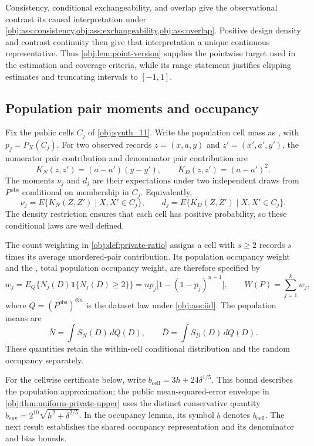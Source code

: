 Consistency, conditional exchangeability, and overlap give the observational contrast its causal interpretation under \cref{obj:ass:consistency,obj:ass:exchangeability,obj:ass:overlap}. Positive design density and contrast continuity then give that interpretation a unique continuous representative. Thus \cref{obj:lem:point-version} supplies the pointwise target used in the estimation and coverage criteria, while its range statement justifies clipping estimates and truncating intervals to \([-1,1]\).

\subsection{Population pair moments and occupancy}

Fix the public cells \(C_j\) of \cref{obj:synth_11}. Write the population cell mass as , with \(p_j=P_X(C_j)\). For two observed records \(z=(x,a,y)\) and \(z'=(x',a',y')\), the numerator pair contribution  and denominator pair contribution  are
\[
K_N(z,z')=(a-a')(y-y'),
\qquad
K_D(z,z')=(a-a')^2.
\]
The moments \(\nu_j\) and \(d_j\) are their expectations under two independent draws from \(P^{\mathrm{obs}}\) conditional on membership in \(C_j\). Equivalently,
\[
\nu_j=E\{K_N(Z,Z')\mid X,X'\in C_j\},
\qquad
d_j=E\{K_D(Z,Z')\mid X,X'\in C_j\}.
\]
The density restriction ensures that each cell has positive probability, so these conditional laws are well defined.

The count weighting in \cref{obj:def:private-ratio} assigns a cell with \(s\ge2\) records \(s\) times its average unordered-pair contribution. Its population occupancy weight and the , total population occupancy weight, are therefore specified by
\[
w_j
=
E_Q\{N_j(D)\mathbf1\{N_j(D)\ge2\}\}
=
np_j\bigl[1-(1-p_j)^{n-1}\bigr],
\qquad
W(P)=\sum_{j=1}^k w_j,
\]
where \(Q=(P^{\mathrm{obs}})^{\otimes n}\) is the dataset law under \cref{obj:ass:iid}. The population means are
\[
\overline N=\int S_N(D)\,dQ(D),
\qquad
\overline D=\int S_D(D)\,dQ(D).
\]
These quantities retain the within-cell conditional distribution and the random occupancy separately.

For the cellwise certificate below, write \(b_{\mathrm{cell}}=3h+24\delta^{1/5}\). This bound describes the population approximation; the public mean-squared-error envelope in \cref{obj:thm:uniform-private-upper} uses the distinct conservative quantity \(b_{\mathrm{env}}=2^{10}\sqrt{h^2+\delta^{2/5}}\). In the occupancy lemma, its symbol \(b\) denotes \(b_{\mathrm{cell}}\). The next result establishes the shared occupancy representation and its denominator and bias bounds.

